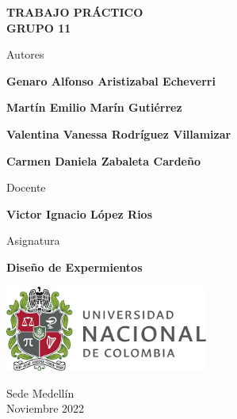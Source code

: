 \begin{titlepage}
   \Large{
   \begin{center}
       \vspace*{1cm}

       \textbf{TRABAJO PRÁCTICO} \\
       \textbf{GRUPO 11}

            
       \vspace{1 cm}
       
       Autores
       
       \vspace{0.3cm}
       
       \textbf{Genaro Alfonso Aristizabal Echeverri} \\
      
              \vspace{0.2 cm}
      
       \textbf{Martín Emilio Marín Gutiérrez} \\
      
              \vspace{0.2 cm}
        
       \textbf{Valentina Vanessa Rodríguez Villamizar} \\
      
              \vspace{0.2 cm}
              
       \textbf{Carmen Daniela Zabaleta Cardeño} \\
      
              \vspace{0.8 cm}
       
      
       Docente
       
       \vspace{0.5 cm}

	\textbf{Victor Ignacio López Rios} 
       
       \vspace{0.5 cm}

       \vspace{0.5 cm}
       
       Asignatura
       
       \vspace{0.5cm}

       \textbf{Diseño de Expermientos}

       \vfill

            
       \vspace{0.1cm}
     
       \includegraphics[width=0.5\textwidth]{logo.png}
            
       Sede Medellín\\
       Noviembre 2022
       
   \end{center}
   }
\end{titlepage}